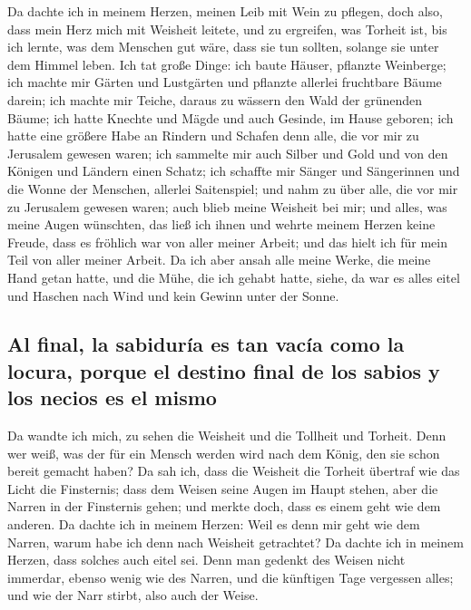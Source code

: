  Da dachte ich in meinem Herzen, meinen Leib mit Wein zu
pflegen, doch also, dass mein Herz mich mit Weisheit leitete, und zu
ergreifen, was Torheit ist, bis ich lernte, was dem Menschen gut wäre,
dass sie tun sollten, solange sie unter dem Himmel leben. 
Ich tat große Dinge: ich baute Häuser, pflanzte Weinberge;
 ich machte mir Gärten und Lustgärten und pflanzte
allerlei fruchtbare Bäume darein;  ich machte mir Teiche,
daraus zu wässern den Wald der grünenden Bäume;  ich hatte
Knechte und Mägde und auch Gesinde, im Hause geboren; ich hatte eine
größere Habe an Rindern und Schafen denn alle, die vor mir zu Jerusalem
gewesen waren;  ich sammelte mir auch Silber und Gold und
von den Königen und Ländern einen Schatz; ich schaffte mir Sänger und
Sängerinnen und die Wonne der Menschen, allerlei Saitenspiel;
 und nahm zu über alle, die vor mir zu Jerusalem gewesen
waren; auch blieb meine Weisheit bei mir;  und alles, was
meine Augen wünschten, das ließ ich ihnen und wehrte meinem Herzen keine
Freude, dass es fröhlich war von aller meiner Arbeit; und das hielt ich
für mein Teil von aller meiner Arbeit.  Da ich aber ansah
alle meine Werke, die meine Hand getan hatte, und die Mühe, die ich
gehabt hatte, siehe, da war es alles eitel und Haschen nach Wind und
kein Gewinn unter der Sonne.

\hypertarget{al-final-la-sabiduruxeda-es-tan-vacuxeda-como-la-locura-porque-el-destino-final-de-los-sabios-y-los-necios-es-el-mismo}{%
\subsection{Al final, la sabiduría es tan vacía como la locura, porque
el destino final de los sabios y los necios es el
mismo}\label{al-final-la-sabiduruxeda-es-tan-vacuxeda-como-la-locura-porque-el-destino-final-de-los-sabios-y-los-necios-es-el-mismo}}

 Da wandte ich mich, zu sehen die Weisheit und die
Tollheit und Torheit. Denn wer weiß, was der für ein Mensch werden wird
nach dem König, den sie schon bereit gemacht haben?  Da
sah ich, dass die Weisheit die Torheit übertraf wie das Licht die
Finsternis;  dass dem Weisen seine Augen im Haupt stehen,
aber die Narren in der Finsternis gehen; und merkte doch, dass es einem
geht wie dem anderen.  Da dachte ich in meinem Herzen:
Weil es denn mir geht wie dem Narren, warum habe ich denn nach Weisheit
getrachtet? Da dachte ich in meinem Herzen, dass solches auch eitel sei.
 Denn man gedenkt des Weisen nicht immerdar, ebenso wenig
wie des Narren, und die künftigen Tage vergessen alles; und wie der Narr
stirbt, also auch der Weise.


